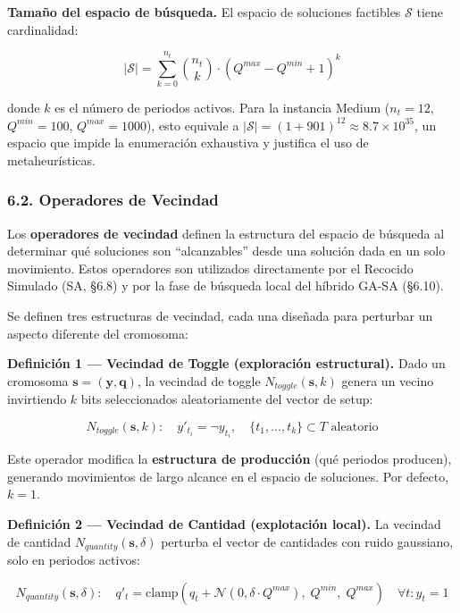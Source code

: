\documentclass[
  spanish,
  12pt,
]{article}
\begin{document}
\textbf{Tamaño del espacio de búsqueda.} El espacio de soluciones
factibles \(\mathcal{S}\) tiene cardinalidad:

\begin{equation}
|\mathcal{S}| = \sum_{k=0}^{n_t} \binom{n_t}{k} \cdot (Q^{max} - Q^{min} + 1)^k
\end{equation}

donde \(k\) es el número de periodos activos. Para la instancia Medium
(\(n_t = 12\), \(Q^{min} = 100\), \(Q^{max} = 1000\)), esto equivale a
\(|\mathcal{S}| = (1 + 901)^{12} \approx 8.7 \times 10^{35}\), un
espacio que impide la enumeración exhaustiva y justifica el uso de
metaheurísticas.

\subsubsection{6.2. Operadores de
Vecindad}\label{operadores-de-vecindad}

Los \textbf{operadores de vecindad} definen la estructura del espacio de
búsqueda al determinar qué soluciones son ``alcanzables'' desde una
solución dada en un solo movimiento. Estos operadores son utilizados
directamente por el Recocido Simulado (SA, §6.8) y por la fase de
búsqueda local del híbrido GA-SA (§6.10).

Se definen tres estructuras de vecindad, cada una diseñada para
perturbar un aspecto diferente del cromosoma:

\textbf{Definición 1 --- Vecindad de Toggle (exploración estructural).}
Dado un cromosoma \(\mathbf{s} = (\mathbf{y}, \mathbf{q})\), la vecindad
de toggle \(N_{toggle}(\mathbf{s}, k)\) genera un vecino invirtiendo
\(k\) bits seleccionados aleatoriamente del vector de setup:

\begin{equation}
N_{toggle}(\mathbf{s}, k): \quad y'_{t_i} = \neg y_{t_i}, \quad \{t_1, ..., t_k\} \subset T \text{ aleatorio}
\end{equation}

Este operador modifica la \textbf{estructura de producción} (qué
periodos producen), generando movimientos de largo alcance en el espacio
de soluciones. Por defecto, \(k = 1\).

\textbf{Definición 2 --- Vecindad de Cantidad (explotación local).} La
vecindad de cantidad \(N_{quantity}(\mathbf{s}, \delta)\) perturba el
vector de cantidades con ruido gaussiano, solo en periodos activos:

\begin{equation}
N_{quantity}(\mathbf{s}, \delta): \quad q'_t = \text{clamp}\left(q_t + \mathcal{N}(0, \delta \cdot Q^{max}),\; Q^{min},\; Q^{max}\right) \quad \forall t : y_t = 1
\end{equation}
\end{document}
